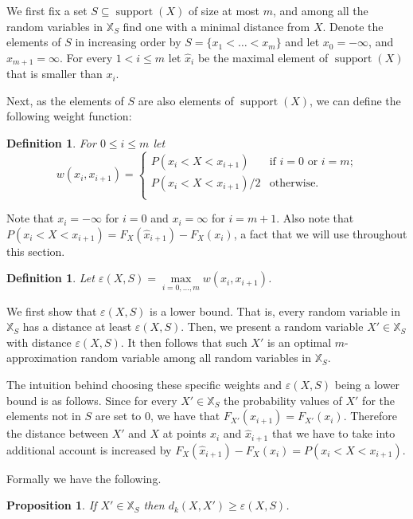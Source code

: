 \documentclass{article}
\newtheorem{definition}[thm]{Definition}
\newtheorem{proposition}[thm]{Proposition}
\DeclareMathOperator{\support}{support}
\begin{document}
We first fix a set $S\subseteq \support(X)$ of size at most $m$, and among all the random variables in $\mathbb{X}_S$ find one with a minimal distance from $X$. Denote the elements of $S$ in increasing order by $S=\{x_1<\dots<x_m\}$ and let $x_0=-\infty$, and $x_{m+1}=\infty$. For every $1 <  i \leq m$ let $\hat x_i$ be the maximal element of $\support(X)$ that is smaller than $x_i$.


Next, as the elements of $S$ are also elements of $\support(X)$, we can define the following weight function:

\begin{definition}\label{def:weight} For $0\leq i \leq m$ let
	\[
	w(x_i,x_{i+1})=
	\begin{cases}
	P(x_i < X < x_{i+1}) & \text{if $i=0$ or $i = m$;} \\
	P(x_i < X < x_{i+1})/2 & \text{otherwise.} \\	
	\end{cases}
	\]
\end{definition}

Note that $x_i = -\infty$ for $i=0$ and $x_i=\infty$ for $i=m+1$. Also note that $P(x_i < X < x_{i+1}) = F_X(\hat x_{i+1}) - F_X(x_i)$, a fact that we will use throughout this section.

\begin{definition}
Let $\varepsilon(X,S) = \max\limits_{i=0,\dots,m} w(x_{i}, x_{i+1})$.
\end{definition}



We first show that $\varepsilon(X,S)$ is a lower bound. That is, every random variable in $\mathbb{X}_S$ has a distance at least $\varepsilon(X,S)$. Then, we present a random variable $X'\in \mathbb{X}_S$ with distance $\varepsilon(X,S)$. It then follows that such $X'$ is an optimal $m$-approximation random variable among all random variables in $\mathbb{X}_S$.

The intuition behind choosing these specific weights and $\varepsilon(X,S)$ being a lower bound is as follows.  Since for every $X'\in\mathbb{X}_S$ the probability values of $X'$ for the elements not in $S$ are set to $0$, we have that $F_{X'}(\hat x_{i+1})=F_{X'}(x_i)$. Therefore the distance between $X'$ and $X$ at points $x_i$ and $\hat x_{i+1}$ that we have to take into additional account is increased by $F_X(\hat x_{i+1})-F_X(x_i) = P(x_i < X < x_{i+1})$.

Formally we have the following.

\begin{proposition}\label{prop:minimal}
	If $X'\in\mathbb{X}_S$ then $d_k(X,X') \geq \varepsilon(X,S)$.
\end{proposition}
\end{document}
